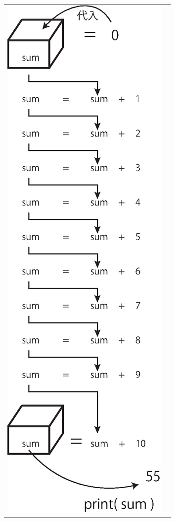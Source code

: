 \documentclass[uplatex,a4paper,11pt,oneside,openany]{jsbook}
\begin{document}
\begin{figure}[H]
  \centering
  \begin{tabular}{cc}
      \begin{minipage}{0.40\hsize}
      \centering

      \end{minipage}
      \begin{minipage}{0.4\hsize}
      \centering
\includegraphics[scale=0.45]{figures/eps/sum.eps}
      \end{minipage}
    \end{tabular}
\end{figure}%
\end{document}
